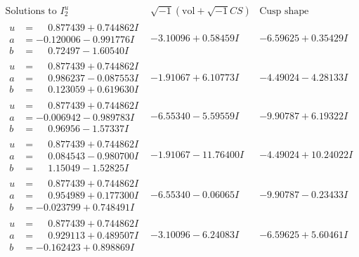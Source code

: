 \documentclass[1p]{elsarticle_modified}
\theoremstyle{definition}
\newcommand{\I}{\sqrt{-1}}
\begin{document}
$$\begin{array}{c|c|c}  
\text{Solutions to }I^u_{2}& \I (\text{vol} + \sqrt{-1}CS) & \text{Cusp shape}\\
 \hline 
\begin{aligned}
u &= \phantom{-}0.877439 + 0.744862 I \\
a &= -0.120006 - 0.991776 I \\
b &= \phantom{-}0.72497 - 1.60540 I\end{aligned}
 & -3.10096 + 0.58459 I & -6.59625 + 0.35429 I \\ \hline\begin{aligned}
u &= \phantom{-}0.877439 + 0.744862 I \\
a &= \phantom{-}0.986237 - 0.087553 I \\
b &= \phantom{-}0.123059 + 0.619630 I\end{aligned}
 & -1.91067 + 6.10773 I & -4.49024 - 4.28133 I \\ \hline\begin{aligned}
u &= \phantom{-}0.877439 + 0.744862 I \\
a &= -0.006942 - 0.989783 I \\
b &= \phantom{-}0.96956 - 1.57337 I\end{aligned}
 & -6.55340 - 5.59559 I & -9.90787 + 6.19322 I \\ \hline\begin{aligned}
u &= \phantom{-}0.877439 + 0.744862 I \\
a &= \phantom{-}0.084543 - 0.980700 I \\
b &= \phantom{-}1.15049 - 1.52825 I\end{aligned}
 & -1.91067 - 11.76400 I & -4.49024 + 10.24022 I \\ \hline\begin{aligned}
u &= \phantom{-}0.877439 + 0.744862 I \\
a &= \phantom{-}0.954989 + 0.177300 I \\
b &= -0.023799 + 0.748491 I\end{aligned}
 & -6.55340 - 0.06065 I & -9.90787 - 0.23433 I \\ \hline\begin{aligned}
u &= \phantom{-}0.877439 + 0.744862 I \\
a &= \phantom{-}0.929113 + 0.489507 I \\
b &= -0.162423 + 0.898869 I\end{aligned}
 & -3.10096 - 6.24083 I & -6.59625 + 5.60461 I \\ \hline\begin{aligned}

\end{aligned}
\end{array}$$
\end{document}
